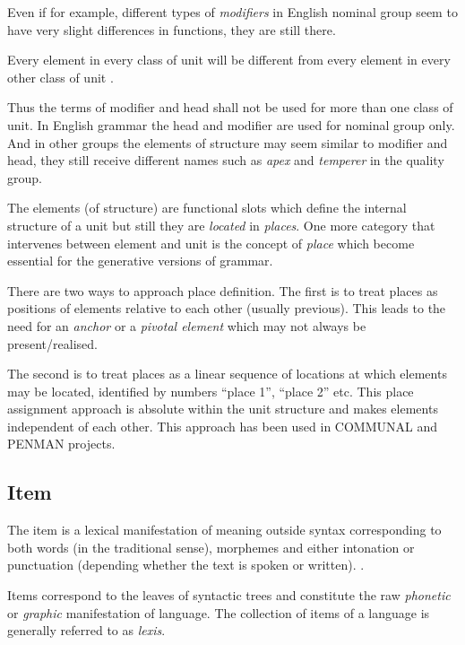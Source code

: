 Even if for example, different types of \textit{modifiers} in English nominal group seem to have very slight differences in functions, they are still there.

\begin{generalization}
    Every element in every class of unit will be different from every element in every other class of unit \citep[214]{Fawcett2000}. 
\end{generalization} 

Thus the terms of modifier and head shall not be used for more than one class of unit. In English grammar the head and modifier are used for nominal group only. And in other groups the elements of structure may seem similar to modifier and head, they still receive different names such as \textit{apex} and \textit{temperer} in the quality group.

The elements (of structure) are functional slots which define the internal structure of a unit but still they are \textit{located} in \textit{places}. One more category that intervenes between element and unit is the concept of \textit{place} which become essential for the generative versions of grammar.

There are two ways to approach place definition. The first is to treat places as positions of elements relative to each other (usually previous). This leads to the need for an \textit{anchor} or a \textit{pivotal element} which may not always be present/realised.

The second is to treat places as a linear sequence of locations at which elements may be located, identified by numbers ``place 1'', ``place 2'' etc. This place assignment approach is absolute within the unit structure and makes elements independent of each other. This approach has been used in COMMUNAL \citep{Fawcett90-communal} and PENMAN \citep{PenmanOverview} projects. 

\subsection{Item}
\begin{definition}[Item]\label{def:item}
	The item is a lexical manifestation of meaning outside syntax corresponding to both words (in the traditional sense), morphemes and either intonation or punctuation (depending whether the text is spoken or written). \citep[226--232]{Fawcett2000}. 
\end{definition}

Items correspond to the leaves of syntactic trees and constitute the raw \textit{phonetic} or \textit{graphic} manifestation of language. The collection of items of a language is generally referred to as \textit{lexis}.


